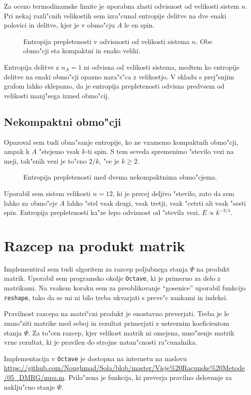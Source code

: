 \documentclass[a4paper,10pt]{article}
\begin{document}
Za oceno termodinamske limite je uporabna zlasti odvisnost od velikosti sistem $n$. Pri nekaj razli"cnih velikostih sem izra"cunal entropije delitve na dve enaki polovici in delitve, kjer je v obmo"cju $A$ le en spin. 

\begin{figure}[H]
 \centering
 
 \caption{Entropija prepletenosti v odvisnosti od velikosti sistema $n$. Obe obmo"cji sta kompaktni in enako veliki. }
 \label{fig:velikost}
\end{figure}

Entropija delitve z $n_A = 1$ ni odvisna od velikosti sistema, medtem ko entropije delitve na enaki obmo"cji opazno nara"s"ca z velikostjo. 
V skladu s prej"snjim grafom lahko sklepamo, da je entropija prepletenosti odvisna predvsem od velikosti manj"sega izmed obmo"cij. 

\subsection{Nekompaktni obmo"cji}

Opazoval sem tudi obna"sanje entropije, ko ne vzamemo kompaktnih obmo"cji, ampak k $A$ "stejemo vsak $k$-ti spin. 
S tem seveda spremenimo "stevilo vezi na meji, tak"snih vezi je to"cno $2/k$, "ce je $k \geq 2$. 

\begin{figure}[H]
 \centering
 
 \caption{Entropija prepletenosti med dvema nekompaktnima obmo"cjema.  }
 \label{fig:nekompaktna}
\end{figure}

Uporabil sem sistem velikosti $n=12$, ki je precej deljivo "stevilo, zato da sem lahko za obmo"cje $A$ lahko "stel vsak drugi, vsak tretji, vsak "cetrti ali vsak "sesti spin. 
Entropija prepletenosti ka"ze lepo odvisnost od "stevila vezi, $E \propto k^{-3/4}$. 

\section{Razcep na produkt matrik}

Implementiral sem tudi algoritem za razcep poljubnega stanja $\Psi$ na produkt matrik. 
Uporabil sem programsko okolje \texttt{Octave}, ki je primerno za delo z matrikami. 
Na vsakem koraku sem za preoblikovanje ``gosenice'' uporabil funkcijo \texttt{reshape}, tako da se mi ni bilo treba ukvarjati s preve"c zankami in indeksi. 

Pravilnost razcepa na matri"cni produkt je enostavno preverjati. 
Treba je le zmno"ziti matrike med seboj in rezultat primerjati z ustreznim koeficientom stanja $\Psi$. 
Za to"cen razcep, kjer velikost matrik ni omejena, mno"zenje matrik vrne rezultat, ki je pravilen do strojne natan"cnosti ra"cunalnika. 

Implementacija v \texttt{Octave} je dostopna na internetu na naslovu \url{https://github.com/Noughmad/Sola/blob/master/Visje%20Racunske%20Metode/05_DMRG/mpa.m}. 
Prilo"zena je funkcija, ki preverja pravilno delovanje za naklju"cno stanje $\Psi$. 
\end{document}
